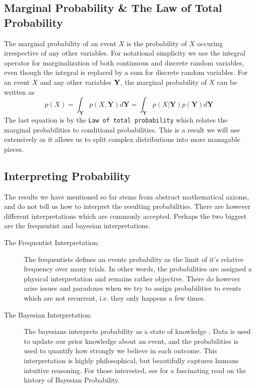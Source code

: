 \subsection{Marginal Probability \& The Law of Total Probability}
The marginal probability of an event $X$ is the probability of $X$ occuring irrespective of any other variables.
For notational simplicity we use the integral operator for marginalization of both continuous and discrete random variables, even though the integral is replaced by a sum for discrete random variables. For an event $X$ and any other variables $\bf Y$, the marginal probability of $X$ can be written as
\begin{equation}
    p(X) = \int_\mathbf{Y} p(X, \mathbf{Y}) d\mathbf{Y} = \int_\mathbf{Y} p(X | \mathbf{Y}) p(\mathbf{Y}) d\mathbf{Y}
\end{equation}
The last equation is by the \texttt{Law of total probability} which relates the marginal probabilities to conditional probabilities. This is a result we will use extensively as it allows us to split complex distributions into more managable pieces.

\subsection{Interpreting Probability}
The results we have mentioned so far stems from abstract mathematical axioms, and do not tell us how to interpret the resulting probabilities. There are however different interpretations which are commonly accepted. Perhaps the two biggest are the frequentist and bayesian interpretations. 

\begin{description}
    \item[The Frequentist Interpretation:] The frequentists defines an events probability as the limit of it's relative frequency over many trials. In other words, the probabilities are assigned a physical interpretation and remains rather objective. There do however arise issues and paradoxes when we try to assign probabilities to events which are not recurrent, i.e. they only happens a few times.
    \item[The Bayesian Interpretation:] The bayesians interprets probability as a state of knowledge \cite{Jaynes86bayesianmethods:}. Data is used to update our prior knowledge about an event, and the probabilities is used to quantify how strongly we believe in each outcome. This interpretation is highly philosophical, but beautifully captures humans intuitive reasoning. For those interested, see \Cite{Jaynes86bayesianmethods:} for a fascinating read on the history of Bayesian Probability.
\end{description}

